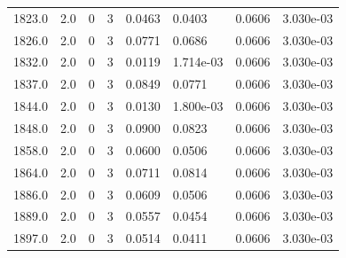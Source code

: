 \documentclass[preview]{standalone}
\begin{document}
{{{{{{{{{\begin{tabular}{L{1.2cm}C{1.2cm} C{0.3cm}C{0.5cm} C{1.4cm}C{1.4cm} C{1.4cm}C{1.4cm}}
  1823.0  &   2.0  & 0     &  3 &  0.0463  & 0.0403  & 0.0606 &  3.030e-03   \\ 
  1826.0  &   2.0  & 0     &  3 &  0.0771  & 0.0686  & 0.0606 &  3.030e-03   \\ 
  1832.0  &   2.0  & 0     &  3 &  0.0119  & 1.714e-03  & 0.0606 &  3.030e-03   \\ 
  1837.0  &   2.0  & 0     &  3 &  0.0849  & 0.0771  & 0.0606 &  3.030e-03   \\ 
  1844.0  &   2.0  & 0     &  3 &  0.0130  & 1.800e-03  & 0.0606 &  3.030e-03   \\ 
  1848.0  &   2.0  & 0     &  3 &  0.0900  & 0.0823  & 0.0606 &  3.030e-03   \\ 
  1858.0  &   2.0  & 0     &  3 &  0.0600  & 0.0506  & 0.0606 &  3.030e-03   \\ 
  1864.0  &   2.0  & 0     &  3 &  0.0711  & 0.0814  & 0.0606 &  3.030e-03   \\ 
  1886.0  &   2.0  & 0     &  3 &  0.0609  & 0.0506  & 0.0606 &  3.030e-03   \\ 
  1889.0  &   2.0  & 0     &  3 &  0.0557  & 0.0454  & 0.0606 &  3.030e-03   \\ 
  1897.0  &   2.0  & 0     &  3 &  0.0514  & 0.0411  & 0.0606 &  3.030e-03   \\ 
\hline 
\end{tabular} 

}}}}}}}}}
\end{document}
